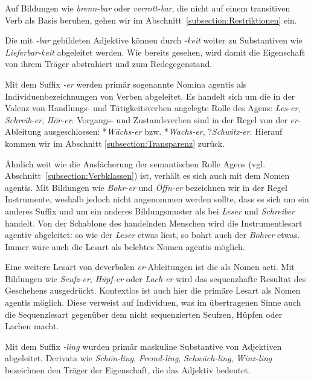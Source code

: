 Auf Bildungen wie \textit{brenn-bar} oder \textit{verrott-bar}, die nicht auf einem transitiven Verb als Basis beruhen, gehen wir im Abschnitt~\ref{subsection:Restriktionen} ein.

Die mit \textit{-bar} gebildeten Adjektive können durch \textit{-keit} weiter zu Substantiven wie \textit{Lieferbar-keit} abgeleitet werden. Wie bereits gesehen, wird damit die Eigenschaft von ihrem Träger abstrahiert und zum Redegegenstand.



\label{subsubsection:er}

Mit dem Suffix \textit{-er} werden primär sogenannte Nomina agentis als Individuenbezeichnungen von Verben abgeleitet. Es handelt sich um die in der Valenz von Handlungs- und Tätigkeitsverben angelegte Rolle des Agens: \textit{Les-er}, \textit{Schreib-er}, \textit{Hör-er}. Vorgangs- und Zustandsverben sind in der Regel von der \textit{er}-Ableitung ausgeschlossen: *\textit{Wächs-er} bzw. *\textit{Wachs-er}, ?\textit{Schwitz-er}. Hierauf kommen wir im Abschnitt \ref{subsection:Transparenz} zurück. 

Ähnlich weit wie die Ausfächerung der semantischen Rolle Agens (vgl. Abschnitt~\ref{subsection:Verbklassen}) ist, verhält es sich auch mit dem Nomen agentis. Mit Bildungen wie \textit{Bohr-er} und \textit{Öffn-er} bezeichnen wir in der Regel Instrumente, weshalb jedoch nicht angenommen werden sollte, dass es sich um ein anderes Suffix und um ein anderes Bildungsmuster als bei \textit{Leser} und \textit{Schreiber} handelt. Von der Schablone des handelnden Menschen wird die Instrumentlesart agentiv abgeleitet: so wie der \textit{Leser} etwas liest, so bohrt auch der \textit{Bohrer} etwas. Immer wäre auch die Lesart als belebtes Nomen agentis möglich. 

Eine weitere Lesart von deverbalen \textit{er}-Ableitungen ist die als Nomen acti. Mit Bildungen wie \textit{Seufz-er}, \textit{Hüpf-er} oder \textit{Lach-er} wird das sequenzhafte Resultat des Geschehens ausgedrückt. Kontextlos ist auch hier die primäre Lesart als Nomen agentis möglich. Diese verweist auf Individuen, was im übertragenen Sinne auch die Sequenzlesart gegenüber dem nicht sequenzierten Seufzen, Hüpfen oder Lachen macht.

\label{subsubsection:ling}

Mit dem Suffix \textit{-ling} wurden primär maskuline Substantive von Adjektiven abgeleitet. Derivata wie \textit{Schön-ling}, \textit{Fremd-ling}, \textit{Schwäch-ling}, \textit{Winz-ling} bezeichnen den Träger der Eigenschaft, die das Adjektiv bedeutet. 

